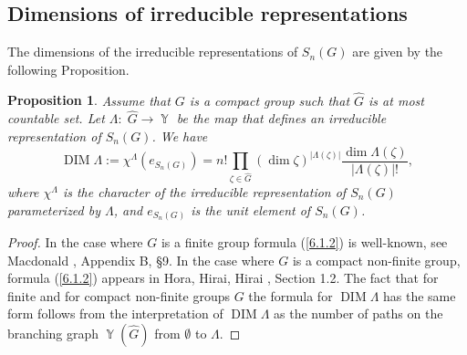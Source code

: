 \documentclass[12pt]{amsart}
\newtheorem{prop}[thm]{Proposition}
\theoremstyle{definition}
\numberwithin{equation}{section}
\DeclareMathOperator{\Y}{\mathbb{Y}}
\DeclareMathOperator{\DIM}{DIM}
\begin{document}
\subsection{Dimensions of irreducible representations}
The dimensions of the irreducible representations of $S_n(G)$ are given by the following Proposition.
\begin{prop}Assume that $G$ is a compact group such that $\widehat{G}$ is at most countable set.
Let $\Lambda:\;\widehat{G}\longrightarrow\Y$ be the map that defines an irreducible representation of $S_n(G)$.
We have
\begin{equation}\label{6.1.2}
\DIM\Lambda:=\chi^{\Lambda}\left(e_{S_n(G)}\right)
=n!\prod\limits_{\zeta\in\widehat{G}}\left(\dim\zeta\right)^{|\Lambda(\zeta)|}\frac{\dim\Lambda(\zeta)}{|\Lambda(\zeta)|!},
\end{equation}
where $\chi^{\Lambda}$ is the character of the irreducible representation of $S_n(G)$ parameterized by $\Lambda$,
and $e_{S_n(G)}$ is the unit element of $S_n(G)$.
\end{prop}
\begin{proof}In the case where $G$ is a finite group formula (\ref{6.1.2}) is well-known, see Macdonald \cite{Macdonald},
Appendix B, \S 9. In the case where $G$ is a compact non-finite group, formula (\ref{6.1.2}) appears
in Hora, Hirai, Hirai \cite{HoraHiraiHiraiII}, Section 1.2. The fact that for finite and for compact non-finite groups
$G$ the formula for $\DIM\Lambda$ has the same form follows from the interpretation of $\DIM\Lambda$
as the number of paths on the branching graph $\Y\left(\widehat{G}\right)$  from $\emptyset$ to $\Lambda$.
\end{proof}
\end{document}
